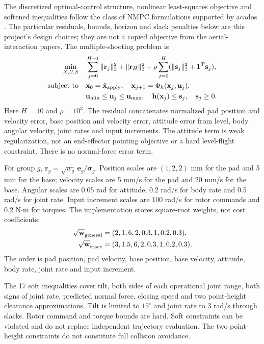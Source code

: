 \documentclass[conference]{IEEEtran}
\begin{document}
The discretized optimal-control structure, nonlinear least-squares objective and softened inequalities follow the class of NMPC formulations supported by acados \cite{acados}. The particular residuals, bounds, horizon and slack penalties below are this project's design choices; they are not a copied objective from the aerial-interaction papers. The multiple-shooting problem is
\begin{align}
\min_{X,U,S}\quad &\sum_{j=0}^{H-1}\|\mathbf r_j\|_2^2+\|\mathbf r_H\|_2^2
+\rho\sum_{j=0}^{H}(\|\mathbf s_j\|_2^2+\mathbf1^T\mathbf s_j),\label{eq:ocp}\\
\text{subject to}\quad &\mathbf x_0=\hat{\mathbf x}_{\rm apply},\quad
\mathbf x_{j+1}=\Phi_h(\mathbf x_j,\mathbf u_j),\nonumber\\
&\mathbf u_{\min}\leq\mathbf u_j\leq\mathbf u_{\max},\quad
\mathbf h(\mathbf x_j)\leq\mathbf s_j,\quad\mathbf s_j\geq0.\nonumber
\end{align}
Here $H=10$ and $\rho=10^3$. The residual concatenates normalized pad position and velocity error, base position and velocity error, attitude error from level, body angular velocity, joint rates and input increments. The attitude term is weak regularization, not an end-effector pointing objective or a hard level-flight constraint. There is no normal-force error term.

For group $g$, $\mathbf r_g=\sqrt{w_g}\,\mathbf e_g/\boldsymbol\sigma_g$. Position scales are $(1,2,2)$ mm for the pad and 5 mm for the base; velocity scales are 5 mm/s for the pad and 20 mm/s for the base. Angular scales are 0.05 rad for attitude, 0.2 rad/s for body rate and 0.5 rad/s for joint rate. Input increment scales are 100 rad/s for rotor commands and 0.2 N$\cdot$m for torques. The implementation stores square-root weights, not cost coefficients:
\begin{align}
\sqrt{\mathbf w}_{\rm general}&=(2,1,6,2,0.3,1,0.2,0.3),\\
\sqrt{\mathbf w}_{\rm trace}&=(3,1.5,6,2,0.3,1,0.2,0.3).
\end{align}
The order is pad position, pad velocity, base position, base velocity, attitude, body rate, joint rate and input increment.

The 17 soft inequalities cover tilt, both sides of each operational joint range, both signs of joint rate, predicted normal force, closing speed and two point-height clearance approximations. Tilt is limited to $15^\circ$ and joint rate to 3 rad/s through slacks. Rotor command and torque bounds are hard. Soft constraints can be violated and do not replace independent trajectory evaluation. The two point-height constraints do not constitute full collision avoidance.
\end{document}
